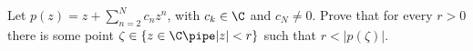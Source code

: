 Let $p(z)=z+\sum_{n=2}^{N}c_n z^n$, with $c_k\in \C$ and $c_N\neq 0$.
Prove that for every $r>0$ there is some point $\zeta\in \{z\in
\C\pipe |z|<r\}$ such that $r<|p(\zeta)|$.

